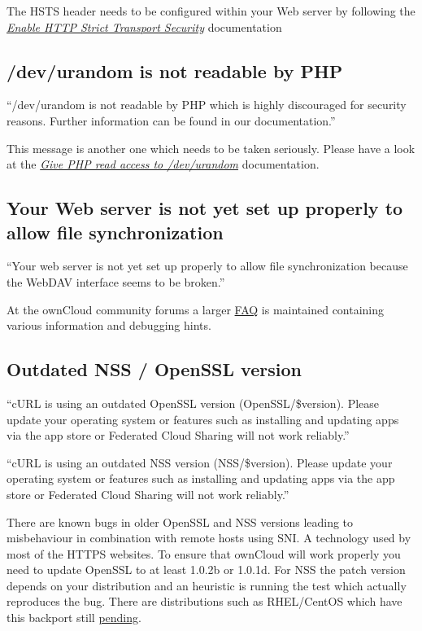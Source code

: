 \documentclass[letterpaper,10pt,english]{sphinxmanual}
\begin{document}
The HSTS header needs to be configured within your Web server by following the
{\hyperref[configuration_server/harden_server:enable\string-hsts\string-label]{\emph{Enable HTTP Strict Transport Security}}} documentation


\subsection{/dev/urandom is not readable by PHP}
\label{configuration_server/security_setup_warnings:dev-urandom-is-not-readable-by-php}
``/dev/urandom is not readable by PHP which is highly discouraged for security reasons.
Further information can be found in our documentation.''

This message is another one which needs to be taken seriously. Please have a look
at the {\hyperref[configuration_server/harden_server:dev\string-urandom\string-label]{\emph{Give PHP read access to /dev/urandom}}} documentation.


\subsection{Your Web server is not yet set up properly to allow file synchronization}
\label{configuration_server/security_setup_warnings:your-web-server-is-not-yet-set-up-properly-to-allow-file-synchronization}
``Your web server is not yet set up properly to allow file synchronization because
the WebDAV interface seems to be broken.''

At the ownCloud community forums a larger \href{https://central.owncloud.org/t/how-to-fix-caldav-carddav-webdav-problems/852}{FAQ}
is maintained containing various information and debugging hints.


\subsection{Outdated NSS / OpenSSL version}
\label{configuration_server/security_setup_warnings:outdated-nss-openssl-version}
``cURL is using an outdated OpenSSL version (OpenSSL/\$version). Please update your
operating system or features such as installing and updating apps via the app store
or Federated Cloud Sharing will not work reliably.''

``cURL is using an outdated NSS version (NSS/\$version). Please update your operating
system or features such as installing and updating apps via the app store or Federated
Cloud Sharing will not work reliably.''

There are known bugs in older OpenSSL and NSS versions leading to misbehaviour in
combination with remote hosts using SNI. A technology used by most of the HTTPS
websites. To ensure that ownCloud will work properly you need to update OpenSSL
to at least 1.0.2b or 1.0.1d. For NSS the patch version depends on your distribution
and an heuristic is running the test which actually reproduces the bug. There
are distributions such as RHEL/CentOS which have this backport still \href{https://bugzilla.redhat.com/show\_bug.cgi?id=1241172}{pending}.
\end{document}
